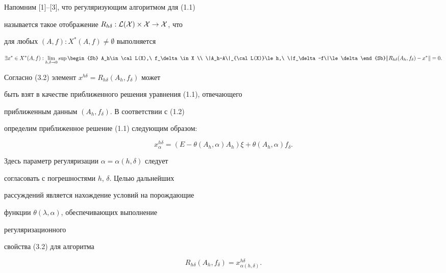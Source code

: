 Напомним [1]--[3], что регуляризующим алгоритмом для (1.1) 


называется такое отображение $R_{h\delta}:\cal L(X)\times X\to X$, что 


для любых $(A,f):X^*(A,f)\ne\emptyset$ выполняется 


\begin{equation} 


\exists x^*\in X^*(A,f):\lim_{h,\delta\to0} 


\sup\begin{Sb} A_h\in\cal L(X),\ f_\delta\in X \\ 


\|A_h-A\|_{\cal L(X)}\le h,\ \|f_\delta-f\|\le\delta\end{Sb} 


\|R_{h\delta}(A_h,f_\delta)-x^*\|=0. 


\end{equation} 


Согласно (3.2) элемент $x^{h\delta}=R_{h\delta}(A_h,f_\delta)$ может 


быть взят в качестве приближенного решения уравнения (1.1), отвечающего 


приближенным данным $(A_h,f_\delta)$. В соответствии с (1.2) 


определим приближенное решение (1.1) следующим образом: 


\begin{equation} 


x^{h\delta}_\alpha=(E-\theta(A_h,\alpha)A_h)\xi+ 


\theta(A_h,\alpha)f_\delta. 


\end{equation} 


Здесь параметр регуляризации $\alpha=\alpha(h,\delta)$ следует 


согласовать с погрешностями $h$, $\delta$. Целью дальнейших 


рассуждений является нахождение условий на порождающие 


функции $\theta(\lambda,\alpha)$, обеспечивающих выполнение 


регуляризационного 


свойства (3.2) для алгоритма 


\begin{equation} 


R_{h\delta}(A_h,f_\delta)=x^{h\delta}_{\alpha(h,\delta)}. 


\end{equation} 



